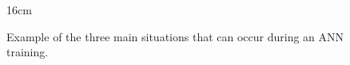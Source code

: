 \begin{figure}[hbtp]{16cm}
	\caption{Example of the three main situations that can occur during an ANN training.}
	\centering
	\quad
	\quad

\end{figure}
